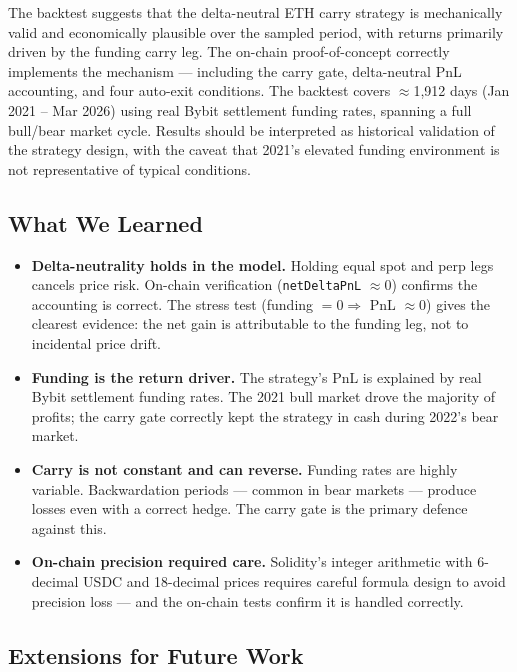 \documentclass[11pt,a4paper]{article}
\begin{document}
The backtest suggests that the delta-neutral ETH carry strategy is mechanically valid and economically plausible over the sampled period, with returns primarily driven by the funding carry leg. The on-chain proof-of-concept correctly implements the mechanism --- including the carry gate, delta-neutral PnL accounting, and four auto-exit conditions. The backtest covers $\approx$1,912 days (Jan 2021 -- Mar 2026) using real Bybit settlement funding rates, spanning a full bull/bear market cycle. Results should be interpreted as historical validation of the strategy design, with the caveat that 2021's elevated funding environment is not representative of typical conditions.

\subsection{What We Learned}

\begin{itemize}
    \item \textbf{Delta-neutrality holds in the model.} Holding equal spot and perp legs cancels price risk. On-chain verification (\texttt{netDeltaPnL} $\approx 0$) confirms the accounting is correct. The stress test (funding $= 0 \Rightarrow$ PnL $\approx 0$) gives the clearest evidence: the net gain is attributable to the funding leg, not to incidental price drift.
    \item \textbf{Funding is the return driver.} The strategy's PnL is explained by real Bybit settlement funding rates. The 2021 bull market drove the majority of profits; the carry gate correctly kept the strategy in cash during 2022's bear market.
    \item \textbf{Carry is not constant and can reverse.} Funding rates are highly variable. Backwardation periods --- common in bear markets --- produce losses even with a correct hedge. The carry gate is the primary defence against this.
    \item \textbf{On-chain precision required care.} Solidity's integer arithmetic with 6-decimal USDC and 18-decimal prices requires careful formula design to avoid precision loss --- and the on-chain tests confirm it is handled correctly.
\end{itemize}

\subsection{Extensions for Future Work}
\end{document}
